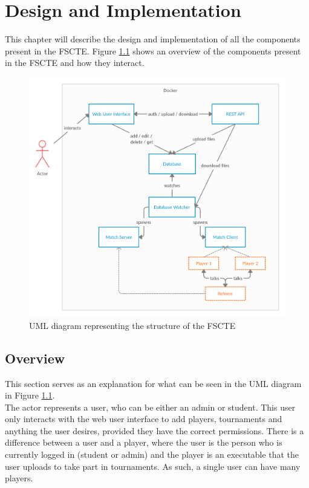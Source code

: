 \documentclass[a4paper, 12pt]{report}
\begin{document}
\chapter{Design and Implementation}
\label{chap:design}

This chapter will describe the design and implementation of all the components
present in the FSCTE. Figure \ref{fig:uml-structure} shows an overview of the
components present in the FSCTE and how they interact.
\begin{figure}[H]
	\centering
	\includegraphics[scale=0.25]{uml-structure.png}
	\caption{UML diagram representing the structure of the FSCTE}
	\label{fig:uml-structure}
\end{figure}

\section{Overview}
\label{sec:impl-overview}

This section serves as an explanation for what can be seen in the UML diagram in
Figure \ref{fig:uml-structure}. \\

The actor represents a user, who can be either an admin or student. This user
only interacts with the web user interface to add players, tournaments and anything
the user desires, provided they have the correct permissions. There is a
difference between a user and a player, where the user is the person who is
currently logged in (student or admin) and the player is an executable that the
user uploads to take part in tournaments. As such, a single user can have many
players. \\
\end{document}
